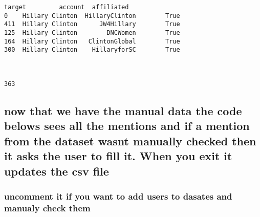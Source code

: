 \documentclass[11pt]{article}
\begin{document}
    \begin{Verbatim}[commandchars=\\\{\}]
              target         account  affiliated
0    Hillary Clinton  HillaryClinton        True
411  Hillary Clinton      JW4Hillary        True
125  Hillary Clinton        DNCWomen        True
164  Hillary Clinton   ClintonGlobal        True
300  Hillary Clinton    HillaryforSC        True



363

    \end{Verbatim}

    \subsection{now that we have the manual data the code belows sees all
the mentions and if a mention from the dataset wasnt manually checked
then it asks the user to fill it. When you exit it updates the csv
file}\label{now-that-we-have-the-manual-data-the-code-belows-sees-all-the-mentions-and-if-a-mention-from-the-dataset-wasnt-manually-checked-then-it-asks-the-user-to-fill-it.-when-you-exit-it-updates-the-csv-file}

\subsubsection{uncomment it if you want to add users to dasates and
manualy check
them}\label{uncomment-it-if-you-want-to-add-users-to-dasates-and-manualy-check-them}
\end{document}
